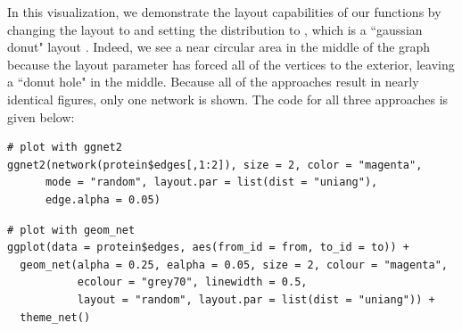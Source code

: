 In this visualization, we demonstrate the layout capabilities of our functions by changing the layout to  and setting the distribution to , which is a  ``gaussian donut" layout \citep{sna}.  Indeed, we see a near circular area in the middle of the graph because the layout parameter has forced all of the vertices to the exterior, leaving a ``donut hole" in the middle. Because all of the approaches result in nearly identical figures, only one network is shown. The code for all three approaches is given below:

\begin{knitrout}
\color{fgcolor}\begin{kframe}
\begin{verbatim}
# plot with ggnet2
ggnet2(network(protein$edges[,1:2]), size = 2, color = "magenta",
      mode = "random", layout.par = list(dist = "uniang"),
      edge.alpha = 0.05)
\end{verbatim}
\end{kframe}
\end{knitrout}

\begin{knitrout}
\color{fgcolor}\begin{kframe}
\begin{verbatim}
# plot with geom_net
ggplot(data = protein$edges, aes(from_id = from, to_id = to)) +
  geom_net(alpha = 0.25, ealpha = 0.05, size = 2, colour = "magenta",
           ecolour = "grey70", linewidth = 0.5,
           layout = "random", layout.par = list(dist = "uniang")) +
  theme_net()
\end{verbatim}
\end{kframe}
\end{knitrout}

